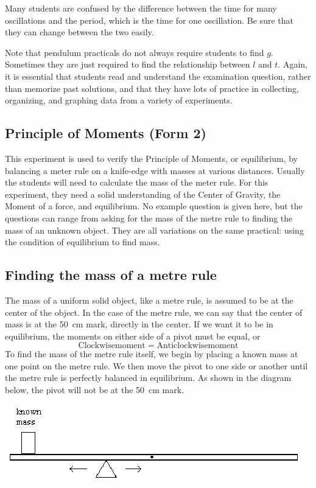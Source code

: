 Many students are confused by the difference between the time for many oscillations and
the period, which is the time for one oscillation. Be sure that they can change between
the two easily.

Note that pendulum practicals do not always require students to find $g$. Sometimes they are just required to find the relationship between $l$ and $t$. Again, it is essential that students read and understand the examination question, rather than memorize past solutions, and that they have lots of practice in collecting, organizing, and graphing data from a variety of experiments.

\subsection{Principle of Moments (Form 2)}

This experiment is used to verify the Principle of Moments, or equilibrium, by
balancing a meter rule on a knife-edge with masses at various distances. Usually the
students will need to calculate the mass of the meter rule. For this experiment, they need
a solid understanding of the Center of Gravity, the Moment of a force, and equilibrium.
No example question is given here, but the questions can range from asking for
the mass of the metre rule to finding the mass of an unknown object. They are all
variations on the same practical: using the condition of equilibrium to find mass.

\subsection{Finding the mass of a metre rule}

The mass of a uniform solid object, like a metre rule, is assumed to be at the
center of the object. In the case of the metre rule, we can say that the center of mass is at
the 50~cm mark, directly in the center. If we want it to be in equilibrium, the moments on
either side of a pivot must be equal, or $$ \mathrm{Clockwise moment} = \mathrm{Anticlockwise moment}$$
To find the mass of the metre rule itself, we begin by placing a known mass at one
point on the metre rule. We then move the pivot to one side or another until the metre
rule is perfectly balanced in equilibrium. As shown in the diagram below, the pivot will
not be at the 50~cm mark.

\begin{center}
\includegraphics{./img/meter-rule.png}
\end{center}

